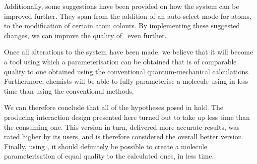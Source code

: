 Additionally, some suggestions have been provided on how the system can be improved further. They span from the addition of an auto-select mode for atoms, to the modification of certain atom colours. By implementing these suggested changes, we can improve the quality of \oframp\ even further.

Once all alterations to the system have been made, we believe that it will become a tool using which a parameterisation can be obtained that is of comparable quality to one obtained using the conventional quantum-mechanical calculations. Furthermore, chemists will be able to fully parameterise a molecule using \oframp{} in less time than using the conventional methods.

We can therefore conclude that all of the hypotheses posed in  hold. The producing interaction design presented here turned out to take up less time than the consuming one. This version in turn, delivered more accurate results, was rated higher by its users, and is therefore considered the overall better version. Finally, using \oframp, it should definitely be possible to create a molecule parameterisation of equal quality to the calculated ones, in less time.
